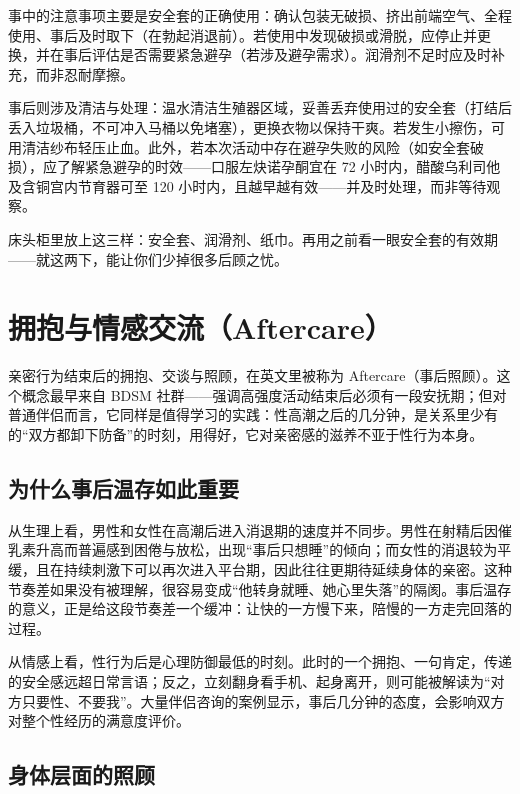 \documentclass[12pt,UTF8]{ctexbook}
\begin{document}
事中的注意事项主要是安全套的正确使用：确认包装无破损、挤出前端空气、全程使用、事后及时取下（在勃起消退前）。若使用中发现破损或滑脱，应停止并更换，并在事后评估是否需要紧急避孕（若涉及避孕需求）。润滑剂不足时应及时补充，而非忍耐摩擦。

事后则涉及清洁与处理：温水清洁生殖器区域，妥善丢弃使用过的安全套（打结后丢入垃圾桶，不可冲入马桶以免堵塞），更换衣物以保持干爽。若发生小擦伤，可用清洁纱布轻压止血。此外，若本次活动中存在避孕失败的风险（如安全套破损），应了解紧急避孕的时效——口服左炔诺孕酮宜在 72 小时内，醋酸乌利司他及含铜宫内节育器可至 120 小时内，且越早越有效——并及时处理，而非等待观察。

\begin{tcolorbox}[colback=pink!5!white,colframe=red!50!black,title=贴心小叮咛]
床头柜里放上这三样：安全套、润滑剂、纸巾。再用之前看一眼安全套的有效期——就这两下，能让你们少掉很多后顾之忧。
\end{tcolorbox}

\chapter{拥抱与情感交流（Aftercare）}

亲密行为结束后的拥抱、交谈与照顾，在英文里被称为 Aftercare（事后照顾）。这个概念最早来自 BDSM 社群——强调高强度活动结束后必须有一段安抚期；但对普通伴侣而言，它同样是值得学习的实践：性高潮之后的几分钟，是关系里少有的“双方都卸下防备”的时刻，用得好，它对亲密感的滋养不亚于性行为本身。

\section{为什么事后温存如此重要}

从生理上看，男性和女性在高潮后进入消退期的速度并不同步。男性在射精后因催乳素升高而普遍感到困倦与放松，出现“事后只想睡”的倾向；而女性的消退较为平缓，且在持续刺激下可以再次进入平台期，因此往往更期待延续身体的亲密。这种节奏差如果没有被理解，很容易变成“他转身就睡、她心里失落”的隔阂。事后温存的意义，正是给这段节奏差一个缓冲：让快的一方慢下来，陪慢的一方走完回落的过程。

从情感上看，性行为后是心理防御最低的时刻。此时的一个拥抱、一句肯定，传递的安全感远超日常言语；反之，立刻翻身看手机、起身离开，则可能被解读为“对方只要性、不要我”。大量伴侣咨询的案例显示，事后几分钟的态度，会影响双方对整个性经历的满意度评价。

\section{身体层面的照顾}
\end{document}
